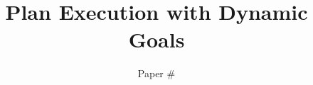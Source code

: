 \documentclass[a4paper]{article}
\begin{document}
\title{Plan Execution with Dynamic Goals}
\author{Paper \#}
\maketitle{}

\begin{abstract}

\end{abstract}




 








\twocolumn 


\end{document}
